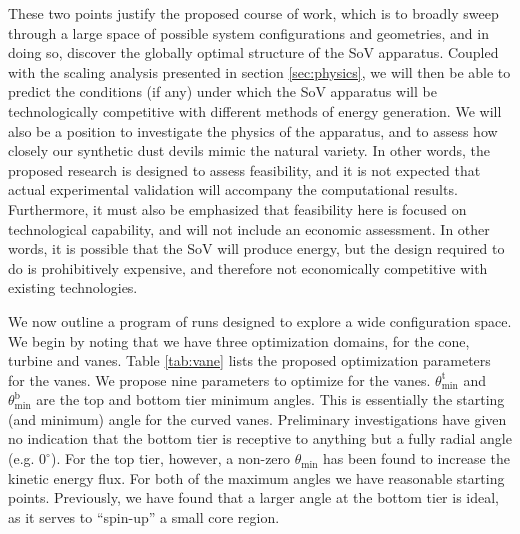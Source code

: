 These two points justify the proposed course of work, which is to
broadly sweep through a large space of possible system configurations
and geometries, and in doing so, discover the globally optimal structure
of the SoV apparatus. Coupled with the scaling analysis presented in
section \ref{sec:physics}, we will then be able to predict the
conditions (if any) under which the SoV apparatus will be
technologically competitive with different methods of energy
generation. We will also be a position to investigate the physics of the
apparatus, and to assess how closely our synthetic dust devils mimic the
natural variety. In other words, the proposed research is designed to
assess feasibility, and it is not expected that actual experimental
validation will accompany the computational results. Furthermore, it
must also be emphasized that feasibility here is focused on
technological capability, and will not include an economic
assessment. In other words, it is possible that the SoV will produce
energy, but the design required to do is prohibitively expensive, and
therefore not economically competitive with existing technologies. 

%
%
We now outline a program of runs designed to explore a wide
configuration space. We begin by noting that we have three 
optimization domains, for the cone, turbine and vanes. Table
\ref{tab:vane} lists the proposed optimization parameters for the
vanes. We propose nine parameters to optimize for the
vanes. $\theta^{\text{t}}_{\text{min}}$ and
$\theta^{\text{b}}_{\text{min}}$ are the top and bottom tier minimum
angles. This is essentially the starting (and minimum) angle for the curved
vanes. Preliminary investigations have given no indication that the
bottom tier is receptive to anything but a fully radial angle
(e.g. $0^{\circ}$). For the top tier, however, a non-zero
$\theta_{\text{min}}$ has been found to increase the kinetic energy
flux. For both of the maximum angles we have reasonable starting
points. Previously, we have found that a larger angle at the bottom tier
is ideal, as it serves to ``spin-up'' a small core region.

